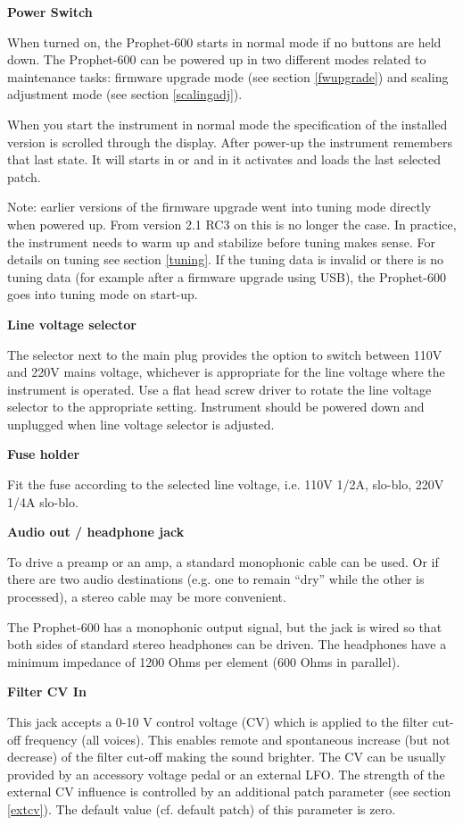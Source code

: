 \textbf{Power Switch}

When turned on, the Prophet-600 starts in normal mode if no buttons are held down. The Prophet-600 can be powered up in two different modes related to maintenance tasks: firmware upgrade mode (see section \ref{fwupgrade}) and scaling adjustment mode (see section \ref{scalingadj}).  

When you start the instrument in normal mode the specification of the installed version is scrolled through the display. After power-up the instrument remembers that last state. It will starts in \livemode or \presetmode and in \presetmode it activates and loads the last selected patch.

Note: earlier versions of the firmware upgrade went into tuning mode directly when powered up. From version 2.1 RC3 on this is no longer the case. In practice, the instrument needs to warm up and stabilize before tuning makes sense. For details on tuning see section \ref{tuning}. If the tuning data is invalid or there is no tuning data (for example after a firmware upgrade using USB), the Prophet-600 goes into tuning mode on start-up.

\textbf{Line voltage selector}

The selector next to the main plug provides the option to switch between 110V and 220V mains voltage, whichever is appropriate for the line voltage where the instrument is operated. Use a flat head screw driver to rotate the line voltage selector to the appropriate setting. Instrument should be powered down and unplugged when line voltage selector is adjusted.

\textbf{Fuse holder}

Fit the fuse according to the selected line voltage, i.e. 110V 1/2A, slo-blo, 220V 1/4A slo-blo.

\textbf{Audio out / headphone jack}

To drive a preamp or an amp, a standard monophonic cable can be used. Or if there are two audio destinations (e.g. one to remain “dry” while the other is processed), a stereo cable may be more convenient.

The Prophet-600 has a monophonic output signal, but the jack is wired so that both sides of standard stereo headphones can be driven. The headphones have a minimum impedance of 1200 Ohms per element (600 Ohms in parallel).

\textbf{Filter CV In}

This jack accepts a 0-10 V control voltage (CV) which is applied to the filter cut-off frequency (all voices). This enables remote and spontaneous increase (but not decrease) of the filter cut-off making the sound brighter. The CV can be usually provided by an accessory voltage pedal or an external LFO. The strength of the external CV influence is controlled by an additional patch parameter (see section \ref{extcv}). The default value (cf. default patch) of this parameter is zero. 

